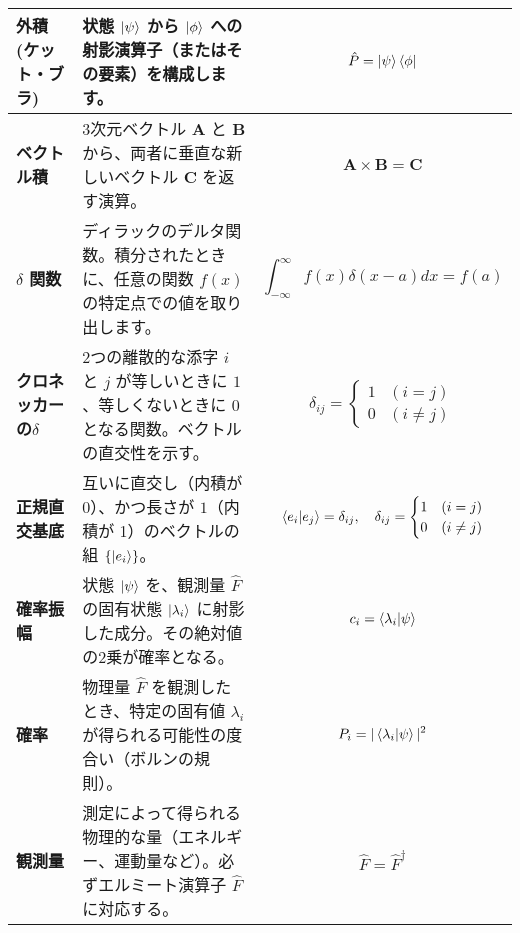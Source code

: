 \documentclass{ltjsarticle}
\begin{document}
\begin{longtable}{| >{\bfseries}l | p{6cm} | p{6cm} |}
\hline
外積 (ケット・ブラ) & 状態 $\ket{\psi}$ から $\ket{\phi}$ への射影演算子（またはその要素）を構成します。 & $$\hat{P} = \ket{\psi}\bra{\phi}$$ \\
\hline
ベクトル積 & 3次元ベクトル $\mathbf{A}$ と $\mathbf{B}$ から、両者に垂直な新しいベクトル $\mathbf{C}$ を返す演算。 & $$\mathbf{A} \times \mathbf{B} = \mathbf{C}$$ \\
\hline
$\delta$ 関数 & ディラックのデルタ関数。積分されたときに、任意の関数 $f(x)$ の特定点での値を取り出します。 & $$\int_{-\infty}^{\infty} f(x) \delta(x-a) dx = f(a)$$ \\
\hline
クロネッカーの$\delta$ & 2つの離散的な添字 $i$ と $j$ が等しいときに $1$、等しくないときに $0$ となる関数。ベクトルの直交性を示す。 & $$\delta_{ij} = \begin{cases} 1 & (i=j) \\ 0 & (i \ne j) \end{cases}$$ \\
\hline
正規直交基底 & 互いに直交し（内積が 0）、かつ長さが $1$（内積が 1）のベクトルの組 $\{ \ket{e_i} \}$。 & $$\braket{e_i|e_j} = \delta_{ij}, \quad \delta_{ij} = \begin{cases} 1 & (i=j) \\ 0 & (i \ne j) \end{cases}$$ \\
\hline
確率振幅 & 状態 $\ket{\psi}$ を、観測量 $\hat{F}$ の固有状態 $\ket{\lambda_i}$ に射影した成分。その絶対値の2乗が確率となる。 & $$c_i = \braket{\lambda_i|\psi}$$ \\
\hline
確率 & 物理量 $\hat{F}$ を観測したとき、特定の固有値 $\lambda_i$ が得られる可能性の度合い（ボルンの規則）。 & $$P_i = |\braket{\lambda_i|\psi}|^2$$ \\
\hline
観測量 & 測定によって得られる物理的な量（エネルギー、運動量など）。必ずエルミート演算子 $\hat{F}$ に対応する。 & $$\hat{F} = \hat{F}^\dagger$$ \\
\hline
\end{longtable}
\end{document}
